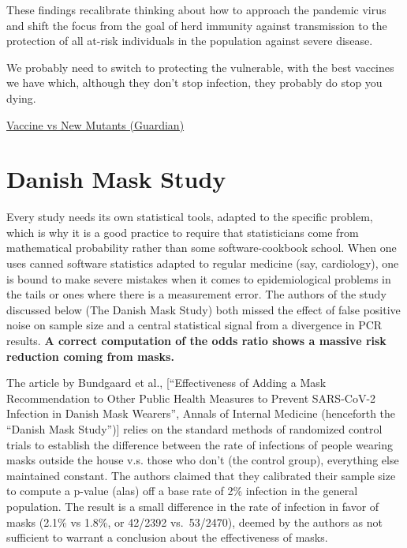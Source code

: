 \documentclass[
]{book}
\begin{document}
These findings recalibrate thinking about how to approach the pandemic virus and shift the focus from the goal of herd immunity against transmission to the protection of all at-risk individuals in the population against severe disease.

We probably need to switch to protecting the vulnerable, with the best vaccines we have which, although they don't stop infection, they probably do stop you dying.

\href{https://www.theguardian.com/society/2021/feb/07/scientists-call-for-rethink-as-doubts-grow-about-achieving-herd-immunity}{Vaccine vs New Mutants (Guardian)}

\hypertarget{danish-mask-study}{%
\section{Danish Mask Study}\label{danish-mask-study}}

Every study needs its own statistical tools, adapted to the specific problem, which is why it is a good practice to require that statisticians come from mathematical probability rather than some software-cookbook school. When one uses canned software statistics adapted to regular medicine (say, cardiology), one is bound to make severe mistakes when it comes to epidemiological problems in the tails or ones where there is a measurement error. The authors of the study discussed below (The Danish Mask Study) both missed the effect of false positive noise on sample size and a central statistical signal from a divergence in PCR results.
\textbf{A correct computation of the odds ratio shows a massive risk reduction coming from masks.}

The article by Bundgaard et al., {[}``Effectiveness of Adding a Mask Recommendation to Other Public Health Measures to Prevent SARS-CoV-2 Infection in Danish Mask Wearers'', Annals of Internal Medicine (henceforth the ``Danish Mask Study''){]} relies on the standard methods of randomized control trials to establish the difference between the rate of infections of people wearing masks outside the house v.s. those who don't (the control group), everything else maintained constant.
The authors claimed that they calibrated their sample size to compute a p-value (alas) off a base rate of 2\% infection in the general population.
The result is a small difference in the rate of infection in favor of masks (2.1\% vs 1.8\%, or 42/2392 vs.~53/2470), deemed by the authors as not sufficient to warrant a conclusion about the effectiveness of masks.
\end{document}
